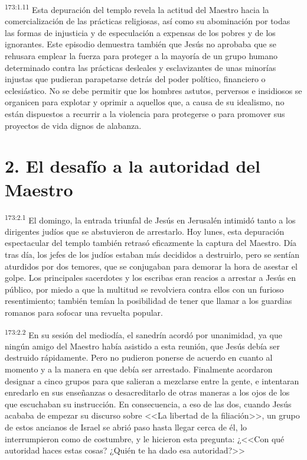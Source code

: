 \par 
\textsuperscript{173:1.11} Esta depuración del templo revela la actitud del Maestro hacia la comercialización de las prácticas religiosas, así como su abominación por todas las formas de injusticia y de especulación a expensas de los pobres y de los ignorantes. Este episodio demuestra también que Jesús no aprobaba que se rehusara emplear la fuerza para proteger a la mayoría de un grupo humano determinado contra las prácticas desleales y esclavizantes de unas minorías injustas que pudieran parapetarse detrás del poder político, financiero o eclesiástico. No se debe permitir que los hombres astutos, perversos e insidiosos se organicen para explotar y oprimir a aquellos que, a causa de su idealismo, no están dispuestos a recurrir a la violencia para protegerse o para promover sus proyectos de vida dignos de alabanza.

\section*{2. El desafío a la autoridad del Maestro}
\par 
\textsuperscript{173:2.1} El domingo, la entrada triunfal de Jesús en Jerusalén intimidó tanto a los dirigentes judíos que se abstuvieron de arrestarlo. Hoy lunes, esta depuración espectacular del templo también retrasó eficazmente la captura del Maestro. Día tras día, los jefes de los judíos estaban más decididos a destruirlo, pero se sentían aturdidos por dos temores, que se conjugaban para demorar la hora de asestar el golpe. Los principales sacerdotes y los escribas eran reacios a arrestar a Jesús en público, por miedo a que la multitud se revolviera contra ellos con un furioso resentimiento; también temían la posibilidad de tener que llamar a los guardias romanos para sofocar una revuelta popular.

\par 
\textsuperscript{173:2.2} En su sesión del mediodía, el sanedrín acordó por unanimidad, ya que ningún amigo del Maestro había asistido a esta reunión, que Jesús debía ser destruido rápidamente. Pero no pudieron ponerse de acuerdo en cuanto al momento y a la manera en que debía ser arrestado. Finalmente acordaron designar a cinco grupos para que salieran a mezclarse entre la gente, e intentaran enredarlo en sus enseñanzas o desacreditarlo de otras maneras a los ojos de los que escuchaban su instrucción. En consecuencia, a eso de las dos, cuando Jesús acababa de empezar su discurso sobre <<La libertad de la filiación>>, un grupo de estos ancianos de Israel se abrió paso hasta llegar cerca de él, lo interrumpieron como de costumbre, y le hicieron esta pregunta: ¿<<Con qué autoridad haces estas cosas? ¿Quién te ha dado esa autoridad?>>

